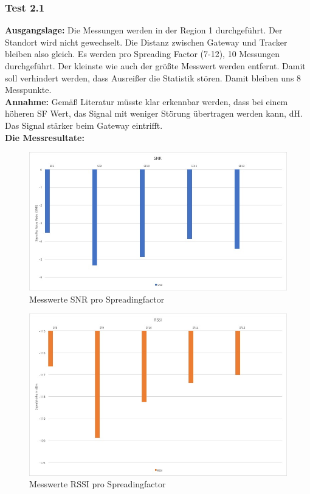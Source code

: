 \documentclass[11pt,english,german]{report}
\theoremstyle{definition}
\begin{document}
\subsubsection{Test 2.1}
\textbf{Ausgangslage:} Die Messungen werden in der Region 1 durchgeführt. Der Standort wird nicht gewechselt. Die Distanz zwischen Gateway und Tracker bleiben also gleich. Es werden pro Spreading Factor (7-12), 10 Messungen durchgeführt. Der kleinste wie auch der größte Messwert werden entfernt. Damit soll verhindert werden, dass Ausreißer die Statistik stören. Damit bleiben uns 8 Messpunkte. \\[0.3cm]
\textbf{Annahme:} Gemäß Literatur müsste klar erkennbar werden, dass bei einem höheren SF Wert, das Signal mit weniger Störung übertragen werden kann, dH. Das Signal stärker beim Gateway eintrifft.\\[0.3cm]
\textbf{Die Messresultate:}
\begin{figure}[H]
	\centering
		\includegraphics[width=\textwidth]{img/testing/testing1_sf_snr.jpg}
		\caption[Messwerte SNR  pro Spreadingfactor]
		{Messwerte SNR pro Spreadingfactor}
\end{figure}
\begin{figure}[H]
	\centering
	\includegraphics[width=\textwidth]{img/testing/testing1_sf_rssi.jpg}
	\caption[Messwerte RSSI pro Spreadingfactor]
	{Messwerte RSSI pro Spreadingfactor}
\end{figure}%
\end{document}
